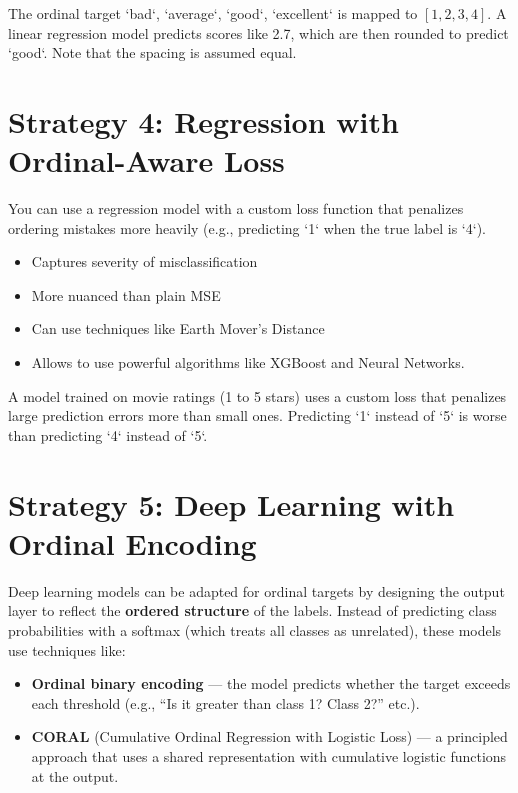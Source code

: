 \documentclass[12pt,openany]{book}
\begin{document}
\begin{examplebox}
The ordinal target `bad`, `average`, `good`, `excellent` is mapped to 
$[1,2,3,4]$. A linear regression model predicts scores like 2.7, which are 
then rounded to predict `good`. Note that the spacing is assumed equal.
\end{examplebox}

\vspace{5pt}

\section{Strategy 4: Regression with Ordinal-Aware Loss}

You can use a regression model with a custom loss function that penalizes
ordering mistakes more heavily (e.g., predicting `1` when the true label is `4`).

\begin{itemize}
    \item Captures severity of misclassification
    \item More nuanced than plain MSE
    \item Can use techniques like Earth Mover's Distance
    \item Allows to use powerful algorithms like XGBoost and Neural Networks.
\end{itemize}

\begin{examplebox}
A model trained on movie ratings (1 to 5 stars) uses a custom loss that 
penalizes large prediction errors more than small ones. Predicting `1` 
instead of `5` is worse than predicting `4` instead of `5`.
\end{examplebox}

\vspace{5pt}



\section{Strategy 5: Deep Learning with Ordinal Encoding}

Deep learning models can be adapted for ordinal targets by designing the output layer to reflect the \textbf{ordered structure} of the labels. Instead of predicting class probabilities with a softmax (which treats all classes as unrelated), these models use techniques like:

\begin{itemize}
    \item \textbf{Ordinal binary encoding} — the model predicts whether the target exceeds each threshold (e.g., ``Is it greater than class 1? Class 2?'' etc.).
    \item \textbf{CORAL} (Cumulative Ordinal Regression with Logistic Loss) — a principled approach that uses a shared representation with cumulative logistic functions at the output.
\end{itemize}
\end{document}

